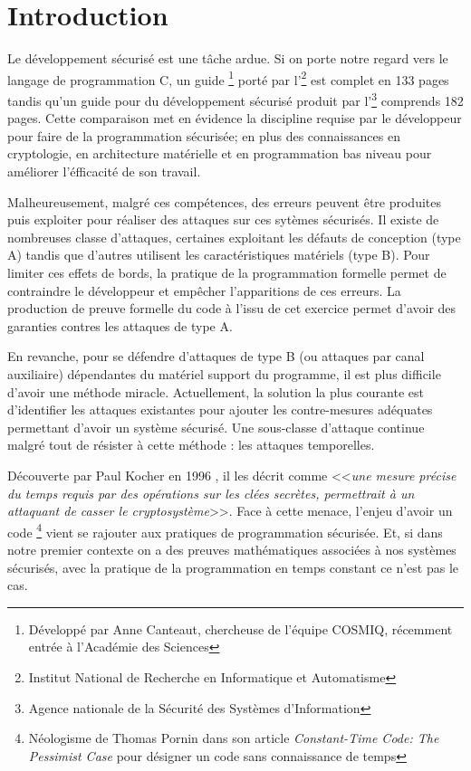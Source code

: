 \chapter*{Introduction}
\label{chap:introduction}

Le développement sécurisé est une tâche ardue. Si on porte notre regard vers le langage de programmation C, un guide \cite{progC_guide}\footnote{Développé par Anne Canteaut, chercheuse de l'équipe COSMIQ, récemment entrée à l'Académie des Sciences} porté par l'\footnote{Institut National de Recherche en Informatique et Automatisme} est complet en 133 pages tandis qu'un guide pour du développement sécurisé\cite{anssi_guideForSecureprogramming} produit par l'\footnote{Agence nationale de la Sécurité des Systèmes d'Information} comprends 182 pages. Cette comparaison met en évidence la discipline requise par le développeur pour faire de la programmation sécurisée; en plus des connaissances en cryptologie, en architecture matérielle et en programmation bas niveau pour améliorer l'éfficacité de son travail.\medbreak

Malheureusement, malgré ces compétences, des erreurs peuvent être produites puis exploiter pour réaliser des attaques sur ces sytèmes sécurisés. Il existe de nombreuses classe d'attaques, certaines exploitant les défauts de conception (type A) tandis que d'autres utilisent les caractéristiques matériels (type B). Pour limiter ces effets de bords, la pratique de la programmation formelle permet de contraindre le développeur et empêcher l'apparitions de ces erreurs. La production de preuve formelle du code à l'issu de cet exercice permet d'avoir des garanties contres les attaques de type A.

En revanche, pour se défendre d'attaques de type B (ou attaques par canal auxiliaire) dépendantes du matériel support du programme, il est plus difficile d'avoir une méthode miracle. Actuellement, la solution la plus courante est d'identifier les attaques existantes pour ajouter les contre-mesures adéquates permettant d'avoir un système sécurisé. Une sous-classe d'attaque continue malgré tout de résister à cette méthode : les attaques temporelles.\medbreak

Découverte par Paul Kocher en 1996 \cite{crypto-1996-1469}, il les décrit comme <<\textit{une mesure précise du temps requis par des opérations sur les clées secrètes, permettrait à un attaquant de casser le cryptosystème}>>. Face à cette menace, l'enjeu d'avoir un code \textit{}\footnote{Néologisme de Thomas Pornin dans son article \textit{Constant-Time Code: The Pessimist Case} \cite{constantTimePornin} pour désigner un code sans connaissance de temps} vient se rajouter aux pratiques de programmation sécurisée. Et, si dans notre premier contexte on a des preuves mathématiques associées à nos systèmes sécurisés, avec la pratique de la programmation en temps constant ce n'est pas le cas.\medbreak

